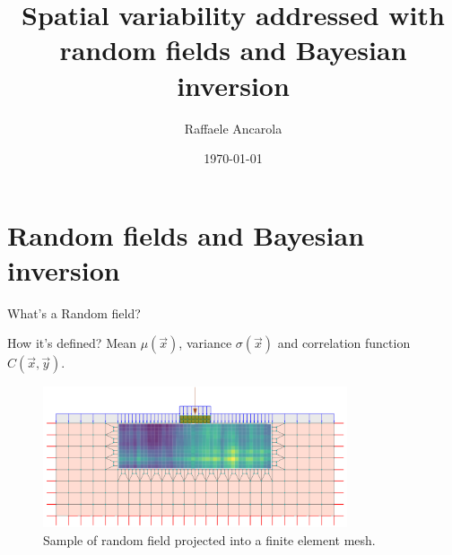 \documentclass[dvipsnames]{beamer}
\author{Raffaele Ancarola}
\title{Spatial variability addressed with random fields and Bayesian inversion}
\institute{Geomod, Stéphane Commend}
\date{\today}
\begin{document}
	\begin{frame}
		\titlepage
	\end{frame}
	
		
	
		
	\section{Random fields and Bayesian inversion}
	
	\begin{frame}{What's a Random field?}
	\begin{block}{How it's defined?}
	Mean $\mu(\vec{x})$, variance $\sigma(\vec{x})$ and correlation function $C(\vec{x}, \vec{y})$.
	\end{block}
	
	\begin{figure}
	\includegraphics[width=0.8\textwidth]{images/rf_view.png}
	\caption{Sample of random field projected into a finite element mesh.}
	\end{figure}
	\end{frame}
	
\end{document}

